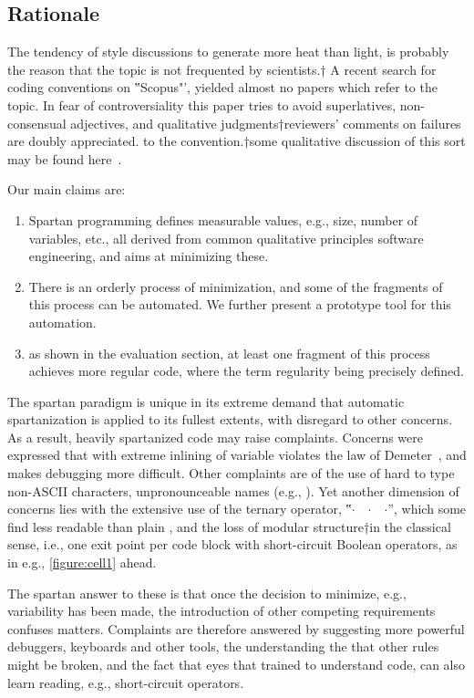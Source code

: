 \subsection{Rationale}

The tendency of style discussions to generate more heat than light, is probably
the reason that the topic is not frequented by scientists.†{%
  A recent search for coding conventions on ‟Scopus"', yielded almost no papers which
refer to the topic.} In fear of controversiality this paper tries to avoid
superlatives, non-consensual adjectives, and qualitative judgments†{reviewers'
comments on failures are doubly appreciated.} to the
convention.†{some qualitative discussion of this
  sort may be found here~\cite{Gil:2010}.}

 Our main claims are:
\begin{enumerate}
    \item Spartan programming defines measurable values, e.g., size, number of
      variables, etc., all derived from common qualitative principles
        software engineering, and aims at minimizing these.
    \item There is an orderly process of minimization,
      and some of the fragments of this process can be automated.
     We further present a prototype tool for this automation.
    \item as shown in the evaluation section, at least one fragment of this
      process achieves more regular code, where the term regularity being
      precisely defined.
\end{enumerate}

 The spartan paradigm is unique in its extreme demand that automatic
  spartanization is applied to its fullest extents, with disregard
  to other concerns.
As a result, heavily spartanized code may raise complaints.
Concerns were expressed that with extreme inlining of variable
violates the law of Demeter~\cite{Lieberherr:96}, and makes debugging more difficult.
Other complaints are of the use of hard to type non-ASCII characters,
  unpronounceable names (e.g., ).
Yet another dimension of concerns lies with the extensive
  use of the ternary operator, ‟$·$~~$·$~\cc{:}~$·$”, which some find
  less readable than plain , and the loss of modular
  structure†{in the classical sense, i.e., one exit point per
  code block} with short-circuit Boolean operators, as in e.g., \cref{figure:cell1}
  ahead.

The spartan answer to these is that once the decision to minimize, e.g.,
  variability has been made, the introduction of other competing requirements
  confuses matters.
Complaints are therefore answered by suggesting more powerful
  debuggers, keyboards and other tools, the understanding the
  that other rules might be broken, and the fact that eyes that
  trained to understand code, can also learn reading, e.g., short-circuit
  operators.

